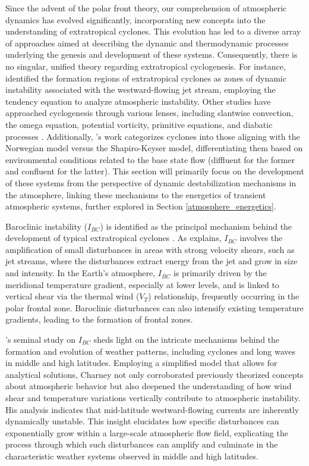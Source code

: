 Since the advent of the polar front theory, our comprehension of atmospheric dynamics has evolved significantly, incorporating new concepts into the understanding of extratropical cyclones. This evolution has led to a diverse array of approaches aimed at describing the dynamic and thermodynamic processes underlying the genesis and development of these systems. Consequently, there is no singular, unified theory regarding extratropical cyclogenesis. For instance, \citet{bjerknes1944theory} identified the formation regions of extratropical cyclones as zones of dynamic instability associated with the westward-flowing jet stream, employing the tendency equation to analyze atmospheric instability. Other studies have approached cyclogenesis through various lenses, including slantwise convection, the omega equation, potential vorticity, primitive equations, and diabatic processes \citep[e.g.]{hoskins1990theory}. Additionally, \citet{schultz1998effect}'s work categorizes cyclones into those aligning with the Norwegian model versus the Shapiro-Keyser model, differentiating them based on environmental conditions related to the base state flow (diffluent for the former and confluent for the latter). This section will primarily focus on the development of these systems from the perspective of dynamic destabilization mechanisms in the atmosphere, linking these mechanisms to the energetics of transient atmospheric systems, further explored in Section \ref{atmosphere_energetics}.


Baroclinic instability (\(I_{BC}\)) is identified as the principal mechanism behind the development of typical extratropical cyclones \citep{charney1947dynamics, bjerknes1922life}. As \citet{holton1973introduction} explains, \(I_{BC}\) involves the amplification of small disturbances in areas with strong velocity shears, such as jet streams, where the disturbances extract energy from the jet and grow in size and intensity. In the Earth's atmosphere, \(I_{BC}\) is primarily driven by the meridional temperature gradient, especially at lower levels, and is linked to vertical shear via the thermal wind (\(V_T\)) relationship, frequently occurring in the polar frontal zone. Baroclinic disturbances can also intensify existing temperature gradients, leading to the formation of frontal zones.

\citet{charney1947dynamics}'s seminal study on \(I_{BC}\) sheds light on the intricate mechanisms behind the formation and evolution of weather patterns, including cyclones and long waves in middle and high latitudes. Employing a simplified model that allows for analytical solutions, Charney not only corroborated previously theorized concepts about atmospheric behavior but also deepened the understanding of how wind shear and temperature variations vertically contribute to atmospheric instability. His analysis indicates that mid-latitude westward-flowing currents are inherently dynamically unstable. This insight elucidates how specific disturbances can exponentially grow within a large-scale atmospheric flow field, explicating the process through which such disturbances can amplify and culminate in the characteristic weather systems observed in middle and high latitudes.

